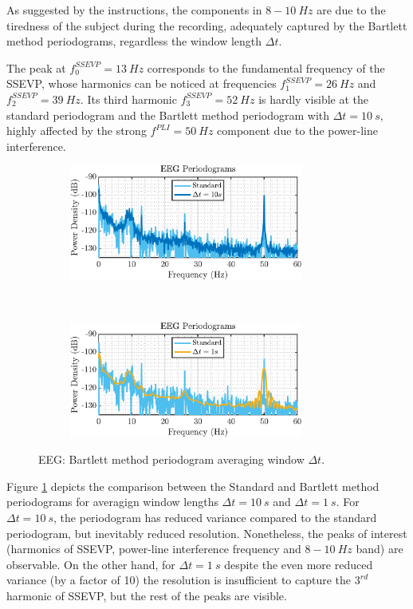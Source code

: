 \begin{enumerate}[label=\alph*), leftmargin=*]
As suggested by the instructions, the components in $8-10\ Hz$ are due to the tiredness of the subject during the recording, adequately captured by the Bartlett method periodograms,
regardless the window length $\Delta t$.

The peak at $f_{0}^{SSEVP} = 13\ Hz$ corresponds to the fundamental frequency of the SSEVP, whose harmonics can be noticed at frequencies $f_{1}^{SSEVP} = 26\ Hz$ and
$f_{2}^{SSEVP} = 39\ Hz$. Its third harmonic $f_{3}^{SSEVP} = 52\ Hz$ is hardly visible at the standard periodogram and the Bartlett method periodogram with $\Delta t = 10\ s$, highly affected by
the strong $f^{PLI} = 50\ Hz$ component due to the power-line interference.

\begin{figure}[h]
    \centering
    \begin{subfigure}{0.49\textwidth}
        \centering
        \includegraphics[height=1.5in]{report/spectrum-estimation/periodogram-based-methods-applied-to-real-world-data/assets/b/eeg-periodogram-averaged-bartlett-dt_10}
    \end{subfigure}
    ~ 
    \begin{subfigure}{0.49\textwidth}
        \centering
        \includegraphics[height=1.5in]{report/spectrum-estimation/periodogram-based-methods-applied-to-real-world-data/assets/b/eeg-periodogram-averaged-bartlett-dt_1}
    \end{subfigure}
    \caption{EEG: Bartlett method periodogram averaging window $\Delta t$.}
    \label{fig:1_4_b_2}
\end{figure}

Figure \ref{fig:1_4_b_2} depicts the comparison between the Standard and Bartlett method periodograms for averagign window lengths $\Delta t = 10\ s$ and $\Delta t = 1\ s$.
For $\Delta t = 10\ s$, the periodogram has reduced variance compared to the standard periodogram, but inevitably reduced resolution. Nonetheless, the peaks of interest
(harmonics of SSEVP, power-line interference frequency and $8-10\ Hz$ band) are observable. On the other hand, for $\Delta t = 1\ s$ despite the even more reduced variance
(by a factor of 10) the resolution is insufficient to capture the $3^{rd}$ harmonic of SSEVP, but the rest of the peaks are visible.


\end{enumerate}
